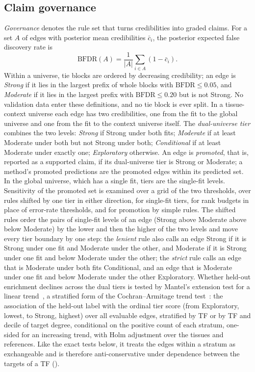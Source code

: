 \documentclass[11pt,a4paper]{article}
\begin{document}
\subsection{Claim governance}\label{sec:governance}
\emph{Governance} denotes the rule set that turns credibilities into graded claims.
For a set $A$ of edges with posterior mean credibilities $\bar c_i$, the posterior expected false discovery rate is~\citep{newton2004detecting}
\begin{equation}
  \mathrm{BFDR}(A)=\frac{1}{|A|}\sum_{i\in A}(1-\bar c_i).
  \label{eq:bfdr}
\end{equation}
Within a universe, tie blocks are ordered by decreasing credibility; an edge is \emph{Strong} if it lies in the largest prefix of whole blocks with $\mathrm{BFDR}\le 0.05$, and \emph{Moderate} if it lies in the largest prefix with $\mathrm{BFDR}\le 0.20$ but is not Strong.
No validation data enter these definitions, and no tie block is ever split.
In a tissue-context universe each edge has two credibilities, one from the fit to the global universe and one from the fit to the context universe itself. The \emph{dual-universe tier} combines the two levels: \emph{Strong} if Strong under both fits; \emph{Moderate} if at least Moderate under both but not Strong under both; \emph{Conditional} if at least Moderate under exactly one; \emph{Exploratory} otherwise.
An edge is \emph{promoted}, that is, reported as a supported claim, if its dual-universe tier is Strong or Moderate; a method's promoted predictions are the promoted edges within its predicted set.
In the global universe, which has a single fit, tiers are the single-fit levels.
Sensitivity of the promoted set is examined over a grid of the two thresholds, over rules shifted by one tier in either direction, for single-fit tiers, for rank budgets in place of error-rate thresholds, and for promotion by simple rules.
The shifted rules order the pairs of single-fit levels of an edge (Strong above Moderate above below Moderate) by the lower and then the higher of the two levels and move every tier boundary by one step: the \emph{lenient} rule also calls an edge Strong if it is Strong under one fit and Moderate under the other, and Moderate if it is Strong under one fit and below Moderate under the other; the \emph{strict} rule calls an edge that is Moderate under both fits Conditional, and an edge that is Moderate under one fit and below Moderate under the other Exploratory.
Whether held-out enrichment declines across the dual tiers is tested by Mantel's extension test for a linear trend~\citep{mantel1963chisquare}, a stratified form of the Cochran--Armitage trend test~\citep{cochran1954some,armitage1955tests}: the association of the held-out label with the ordinal tier score (from Exploratory, lowest, to Strong, highest) over all evaluable edges, stratified by TF or by TF and decile of target degree, conditional on the positive count of each stratum, one-sided for an increasing trend, with Holm adjustment over the tissues and references. Like the exact tests below, it treats the edges within a stratum as exchangeable and is therefore anti-conservative under dependence between the targets of a TF ().
\end{document}
